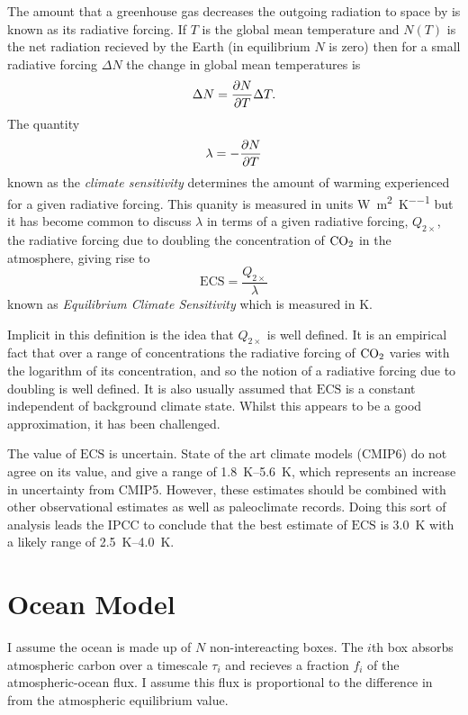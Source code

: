 The amount that a greenhouse gas decreases the outgoing radiation to space by is known as its radiative forcing. If $T$ is
the global mean temperature and $N(T)$ is the net radiation recieved by the Earth (in equilibrium $N$ is zero) then for a small
radiative forcing $\Delta N$ the change in global mean temperatures is
\begin{equation}
  \label{eq:response_to_radiative_forcing}
  \Delta N = \pdv{N}{T} \Delta T.
\end{equation}
The quantity
\begin{equation}
  \label{eq:climate_sensitivity}
  \lambda = -\pdv{N}{T}
\end{equation}
known as the \emph{climate sensitivity} determines the amount of warming experienced for a given radiative forcing. This quanity is measured
in units \si{\watt\per\square\meter\per\kelvin} but it has become common to discuss $\lambda$ in terms of a given radiative forcing, $Q_{2\times}$,
the radiative forcing due to doubling the concentration of $\ce{CO2}$ in the atmosphere, giving rise to
\begin{equation}
  \label{eq:definition_of_ECS}
  \mathrm{ECS} = \frac{Q_{2\times}}{\lambda}
\end{equation}
known as \emph{Equilibrium Climate Sensitivity} which is measured in \si{\kelvin}.

Implicit in this definition is the idea that $Q_{2\times}$ is well defined. It is an empirical fact that over a range of concentrations the radiative forcing
of $\ce{CO2}$ varies with the logarithm of its concentration, and so the notion of a radiative forcing due to doubling is well defined. It is also usually assumed that
$\mathrm{ECS}$ is a constant independent of background climate state. Whilst this appears to be a good approximation, it has been challenged.

The value of $\mathrm{ECS}$ is uncertain. State of the art climate models (CMIP6) do not agree on its value, and give a range of \SIrange{1.8}{5.6}{\kelvin}, which represents an
increase in uncertainty from CMIP5. However, these estimates should be combined with other observational estimates as well as paleoclimate records. Doing this sort of
analysis leads the IPCC to conclude that the best estimate of $\mathrm{ECS}$ is \SI{3.0}{\kelvin} with a likely range of \SIrange{2.5}{4.0}{\kelvin}.


\section{Ocean Model}
I assume the ocean is made up of $N$ non-intereacting boxes.
The $i$th box absorbs atmospheric carbon over a timescale $\tau_i$ and recieves a fraction
$f_i$ of the atmospheric-ocean  flux. I assume this flux is proportional to the difference in 
from the atmospheric equilibrium value.

